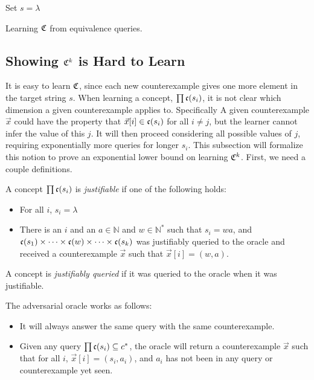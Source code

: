\documentclass[11pt]{amsart}
\begin{document}
\begin{algorithm}[H]
\label{ntree}
\SetAlgoLined
\KwResult{}
Set $s = \lambda$\;
\caption{Learning $\mathfrak{C}$ from equivalence queries.}
\end{algorithm}


\subsection{Showing $\mathfrak{C}^k$ is Hard to Learn}

It is easy to learn $\mathfrak{C}$, since each new counterexample gives one more element in the target string $s$. 
When learning a concept, $\prod \mathfrak{c}(s_i)$, it is not clear which dimension a given counterexample applies to. 
Specifically A given counterexample $\vec{x}$ could have the property that $\vec{x}[i] \in \mathfrak{c}(s_i)$ for all $i \ne j$, but the learner cannot infer the value of this $j$. 
It will then proceed considering all possible values of $j$, requiring exponentially more queries for longer $s_i$.  
This subsection will formalize this notion to prove an exponential lower bound on learning $\mathfrak{C}^k$. 
First, we need a couple definitions. 


A concept $\prod \mathfrak{c}(s_i)$ is \emph{justifiable} if one of the following holds:
\begin{itemize}
\item For all $i$, $s_i = \lambda$
\item There is an $i$ and an $a \in \mathbb{N}$ and $w \in \mathbb{N}^*$ such that $s_i = wa$, and $\mathfrak{c}(s_1) \times \dots \times \mathfrak{c}(w) \times \dots \times \mathfrak{c}(s_k)$  was justifiably queried to the oracle and received a counterexample $\vec{x}$ such that $\vec{x}[i] = (w, a)$. 
\end{itemize}

A concept is \emph{justifiably queried} if it was queried to the oracle when it was justifiable. 
\newline


The adversarial oracle works as follows:
\begin{itemize}
\item It will always answer the same query with the same counterexample.  
\item Given any query $\prod \mathfrak{c}(s_i) \subseteq c^*$, the oracle will return a counterexample $\vec{x}$ such that for all $i$, $\vec{x}[i] = (s_i, a_i)$, and $a_i$ has not been in any query or counterexample yet seen.
\end{itemize}
\end{document}
